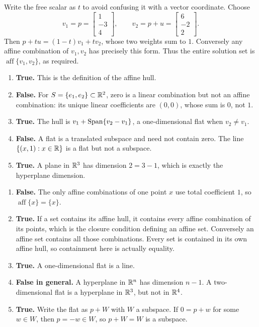 Write the free scalar as $t$ to avoid confusing it with a vector coordinate. Choose
\[v_1=p=\begin{bmatrix}1\\-3\\4\end{bmatrix},\qquad v_2=p+u=\begin{bmatrix}6\\-2\\2\end{bmatrix}.\]
Then $p+tu=(1-t)v_1+tv_2$, whose two weights sum to $1$. Conversely any affine combination of $v_1,v_2$ has precisely this form. Thus the entire solution set is $\operatorname{aff}\{v_1,v_2\}$, as required.

\begin{enumerate}[label=(\alph*)]
\item \textbf{True.} This is the definition of the affine hull.
\item \textbf{False.} For $S=\{e_1,e_2\}\subset\mathbb{R}^2$, zero is a linear combination but not an affine combination: its unique linear coefficients are $(0,0)$, whose sum is $0$, not $1$.
\item \textbf{True.} The hull is $v_1+\operatorname{Span}\{v_2-v_1\}$, a one-dimensional flat when $v_2\ne v_1$.
\item \textbf{False.} A flat is a translated subspace and need not contain zero. The line $\{(x,1):x\in\mathbb{R}\}$ is a flat but not a subspace.
\item \textbf{True.} A plane in $\mathbb{R}^3$ has dimension $2=3-1$, which is exactly the hyperplane dimension.
\end{enumerate}

\begin{enumerate}[label=(\alph*)]
\item \textbf{False.} The only affine combinations of one point $x$ use total coefficient $1$, so $\operatorname{aff}\{x\}=\{x\}$.
\item \textbf{True.} If a set contains its affine hull, it contains every affine combination of its points, which is the closure condition defining an affine set. Conversely an affine set contains all those combinations. Every set is contained in its own affine hull, so containment here is actually equality.
\item \textbf{True.} A one-dimensional flat is a line.
\item \textbf{False in general.} A hyperplane in $\mathbb{R}^n$ has dimension $n-1$. A two-dimensional flat is a hyperplane in $\mathbb{R}^3$, but not in $\mathbb{R}^4$.
\item \textbf{True.} Write the flat as $p+W$ with $W$ a subspace. If $0=p+w$ for some $w\in W$, then $p=-w\in W$, so $p+W=W$ is a subspace.
\end{enumerate}

